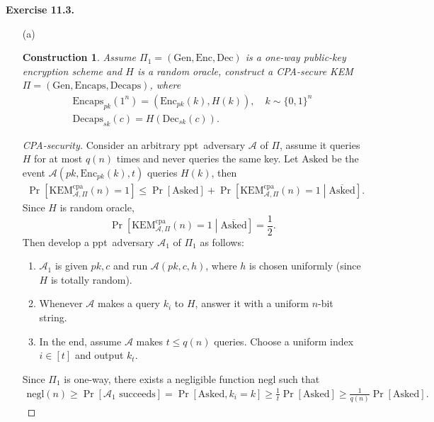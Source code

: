 \documentclass[a4paper]{article}
\newtheorem{construction}{Construction}
\newtheorem*{proof}{Proof}
\newenvironment{exercise}[1]{
	\par
	\noindent\textbf{Exercise #1.}\quad
}{
	\par
	\bigskip
}
\newcommand{\sbra}[1]{\left[ #1 \right]}
\newcommand{\bin}{\{0,1\}}
\newcommand{\Enc}{\mathrm{Enc}}
\newcommand{\Gen}{\mathrm{Gen}}
\newcommand{\Dec}{\mathrm{Dec}}
\newcommand{\KEM}{\mathrm{KEM}}
\newcommand{\Encaps}{\mathrm{Encaps}}
\newcommand{\Decaps}{\mathrm{Decaps}}
\newcommand{\negl}{\mathrm{negl}}
\newcommand{\ppt}{{\sc ppt}~}
\newcommand{\cpa}{\mathrm{cpa}}
\newcommand{\Asked}{\mathrm{Asked}}
\newcommand{\Acal}{\mathcal{A}}
\begin{document}
\begin{exercise}{11.3}
\begin{itemize}
    \item[(a)]
        \begin{construction}
            Assume $\Pi_1=(\Gen,\Enc,\Dec)$ is a one-way public-key encryption scheme and $H$ is a random oracle, 
            construct a CPA-secure KEM 
            $\Pi=(\Gen,\Encaps,\Decaps)$, where
            \begin{gather*}
                \Encaps_{pk}(1^n)=(\Enc_{pk}(k),H(k)), \quad k\sim\bin^n\\
                \Decaps_{sk}(c)=H(\Dec_{sk}(c)).
            \end{gather*}
        \end{construction}
        \begin{proof}[CPA-security]
            Consider an arbitrary \ppt adversary $\Acal$ of $\Pi$, assume it queries $H$ for at most $q(n)$ times and never queries the same key.
            Let $\Asked$ be the event $\Acal(pk,\Enc_{pk}(k),t)$ queries $H(k)$, then
            \begin{align*}
                \Pr\sbra{\KEM_{\Acal,\Pi}^\cpa(n)=1}\leq\Pr\sbra{\Asked}
                +\Pr\sbra{\KEM_{\Acal,\Pi}^\cpa(n)=1\middle|\overline{\Asked}}.
            \end{align*}
            Since $H$ is random oracle, 
            $$
            \Pr\sbra{\KEM_{\Acal,\Pi}^\cpa(n)=1\middle|\overline{\Asked}}=\frac12.
            $$
            Then develop a \ppt adversary $\Acal_1$ of $\Pi_1$ as follows:
            \begin{enumerate}
                \item $\Acal_1$ is given $pk,c$ and run $\Acal(pk,c,h)$, where $h$ is chosen uniformly 
                    (since $H$ is totally random). 
                \item Whenever $\Acal$ makes a query $k_i$ to $H$, answer it with a uniform $n$-bit string.
                \item In the end, assume $\Acal$ makes $t\leq q(n)$ queries.
                    Choose a uniform index $i\in[t]$ and output $k_t$.
            \end{enumerate}
            Since $\Pi_1$ is one-way, there exists a negligible function $\negl$ such that
            \begin{align*}
                \negl(n)\geq\Pr\sbra{\Acal_1\text{ succeeds}}=
                \Pr\sbra{\Asked,k_i=k}\geq\frac1t\Pr\sbra{\Asked}\geq\frac{1}{q(n)}\Pr\sbra{\Asked}.

\end{align*}
\end{proof}
\end{itemize}
\end{exercise}
\end{document}
